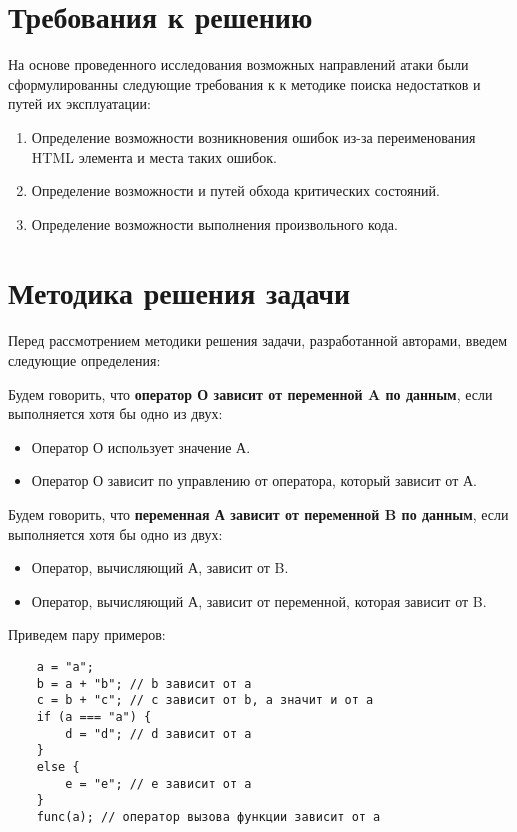 \section{Требования к решению}
На основе проведенного исследования возможных направлений атаки были сформулированны следующие требования к к методике поиска недостатков и путей их эксплуатации:

\begin{enumerate}
	\item Определение возможности возникновения ошибок из-за переименования HTML элемента и места таких ошибок.
	\item Определение возможности и путей обхода критических состояний.
	\item Определение возможности выполнения произвольного кода.
\end{enumerate}

\section{Методика решения задачи}
Перед рассмотрением методики решения задачи, разработанной авторами, введем следующие определения:


Будем говорить, что \textbf{оператор О зависит от переменной A по данным}, если выполняется хотя бы одно из двух:
\begin{itemize}
	\item Оператор О использует значение А.
	\item Оператор О зависит по управлению от оператора, который зависит от А.
\end{itemize}


Будем говорить, что \textbf{переменная А зависит от переменной B по данным}, если выполняется хотя бы одно из двух:
\begin{itemize}
	\item Оператор, вычисляющий А, зависит от B.
	\item Оператор, вычисляющий А, зависит от переменной, которая зависит от B.
\end{itemize}

\bigskip
Приведем пару примеров:
\begin{lstlisting}
	a = "a";
	b = a + "b"; // b зависит от a
	c = b + "c"; // c зависит от b, а значит и от a
	if (a === "a") { 
		d = "d"; // d зависит от a
	}
	else {
		e = "e"; // e зависит от a
	}
	func(a); // оператор вызова функции зависит от a
\end{lstlisting}
\bigskip


